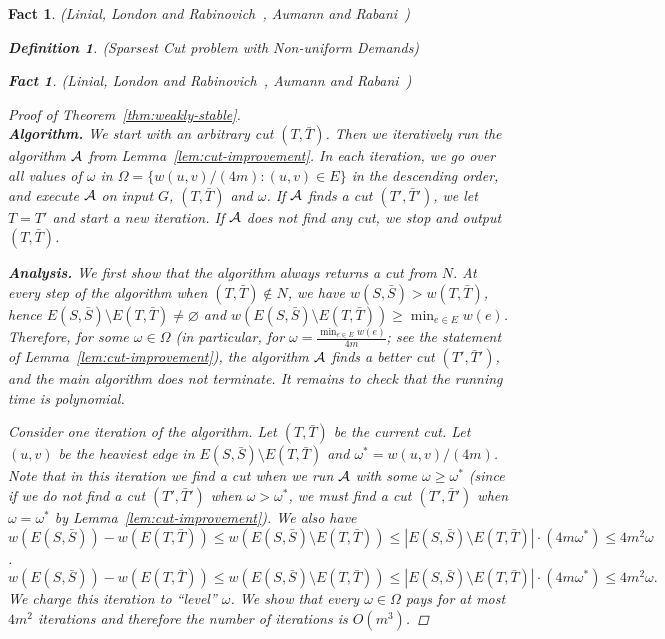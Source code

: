 \documentclass[twoside,leqno,twocolumn]{article}
\newtheorem{Definition}[theorem]{Definition}
\newtheorem{fact}[theorem]{Fact}
\newcommand{\N}{N}
\begin{document}
\begin{fact}{\sc (Linial, London and Rabinovich~\cite{LLR}, Aumann and Rabani~\cite{AR})}
\begin{Definition} {\sc (Sparsest Cut problem with Non-uniform Demands)}
\begin{fact}{\sc (Linial, London and Rabinovich~\cite{LLR}, Aumann and Rabani~\cite{AR})}
\else
\begin{proof}[Proof of Theorem~\ref{thm:weakly-stable}] {\ }\\
\fi
\indent\textbf{Algorithm.} 
We start with an arbitrary cut $(T,\bar T)$. Then we iteratively run the algorithm $\cal A$ 
from Lemma~\ref{lem:cut-improvement}. 
In each iteration, we go over all values of $\omega$ in $\Omega = \{w(u,v)/(4m) : (u,v) \in E\}$ in the descending order,
and execute $\cal A$ on input $G$, $(T,\bar T)$ and $\omega$. If $\cal A$ 
finds a cut $(T', \bar T')$, we let $T = T'$ and start a new iteration. If $\cal A$ does not find any cut, we stop and output $(T,\bar T)$.

\textbf{Analysis.} 
We first show that the algorithm always returns a cut from $N$. At every step of the algorithm when $(T, \bar T)\notin \N$, we have $w(S,\bar S) > w(T, \bar T)$, hence
$E(S,\bar S)\setminus E(T, \bar T)\neq \varnothing$ and $w(E(S,\bar S)\setminus E(T, \bar T)) \geq \min_{e\in E} w(e)$. Therefore,
for some $\omega\in \Omega$ (in particular, for $\omega = \frac{\min_{e\in E} w(e)}{4m}$; see the statement of Lemma~\ref{lem:cut-improvement}), the algorithm $\cal A$ finds a
better cut $(T',\bar T')$, and the main algorithm does not terminate. It remains to check that the running time is polynomial.


Consider one iteration of the algorithm. Let $(T,\bar T)$ be the current cut. Let $(u,v)$ be the heaviest edge in $E(S,\bar S) \setminus E(T,\bar T)$
and $\omega^* = w(u,v) / (4m)$. Note that in this iteration we find a cut when we run $\cal A$ with some $\omega \geq \omega^*$
(since if we do not find a cut $(T',\bar T')$ when $\omega > \omega^*$, we must find a cut $(T', \bar T')$ when $\omega = \omega^*$ by
Lemma~\ref{lem:cut-improvement}). We also have
\ifSODA
$w(E(S,\bar S)) - w(E(T,\bar T)) \leq w(E(S,\bar S)\setminus E(T,\bar T)) \leq  |E(S,\bar S)\setminus E(T,\bar T)| 
\cdot (4m \omega^*) \leq 4m^2 \omega$.
\else
$$w(E(S,\bar S)) - w(E(T,\bar T)) \leq w(E(S,\bar S)\setminus E(T,\bar T)) \leq  |E(S,\bar S)\setminus E(T,\bar T)| 
\cdot (4m \omega^*) \leq 4m^2 \omega.$$
\fi
We charge this iteration to ``level'' $\omega$. We show that every $\omega \in \Omega$ pays for at most $4m^2$ iterations and therefore the number of iterations is $O(m^3)$.


\end{proof}
\end{fact}
\end{Definition}
\end{fact}
\end{document}
